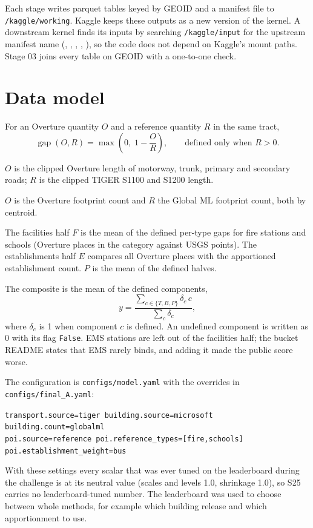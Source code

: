 \documentclass[11pt]{article}
\newcommand{\gap}{\operatorname{gap}}
\begin{document}
Each stage writes parquet tables keyed by GEOID and a manifest file to
\texttt{/kaggle/working}. Kaggle keeps these outputs as a new version of the
kernel. A downstream kernel finds its inputs by searching
\texttt{/kaggle/input} for the upstream manifest name
(, ,
, ,
), so the code does not depend on Kaggle's
mount paths. Stage 03 joins every table on GEOID with a one-to-one check.

\section{Data model}

For an Overture quantity $O$ and a reference quantity $R$ in the same tract,
\begin{equation}
\gap(O, R) = \max\!\left(0,\; 1 - \frac{O}{R}\right), \qquad
\text{defined only when } R > 0.
\label{eq:gap}
\end{equation}

\begin{description}[leftmargin=0pt, itemsep=4pt]
\item[Transport $T$.] $O$ is the clipped Overture length of motorway, trunk,
primary and secondary roads; $R$ is the clipped TIGER S1100 and S1200 length.
\item[Building $B$.] $O$ is the Overture footprint count and $R$ the Global
ML footprint count, both by centroid.
\item[Points of interest $P$.] The facilities half $F$ is the mean of the
defined per-type gaps for fire stations and schools (Overture places in the
category against USGS points). The establishments half $E$ compares all
Overture places with the apportioned establishment count. $P$ is the mean of
the defined halves.
\end{description}

The composite is the mean of the defined components,
\begin{equation}
y = \frac{\sum_{c \in \{T, B, P\}} \delta_c\, c}{\sum_{c} \delta_c},
\end{equation}
where $\delta_c$ is 1 when component $c$ is defined. An undefined component
is written as 0 with its flag \texttt{False}. EMS stations are left out of
the facilities half; the bucket README states that EMS rarely binds, and
adding it made the public score worse.

The configuration is \texttt{configs/model.yaml} with the overrides in
\texttt{configs/final\_A.yaml}:
\begin{center}\small
\texttt{transport.source=tiger building.source=microsoft building.count=globalml}\\
\texttt{poi.source=reference poi.reference\_types=[fire,schools] poi.establishment\_weight=bus}
\end{center} With these settings every scalar that
was ever tuned on the leaderboard during the challenge is at its neutral
value (scales and levels 1.0, shrinkage 1.0), so S25 carries no
leaderboard-tuned number. The leaderboard was used to choose between whole
methods, for example which building release and which apportionment to use.
\end{document}
